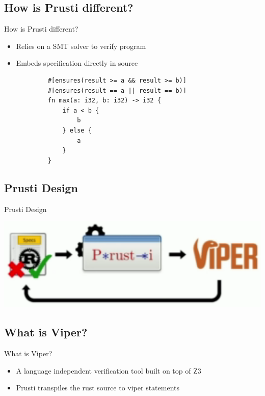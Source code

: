 \documentclass[usenames,dvipsnames,aspectratio=169]{beamer}
\begin{document}
\subsection{How is Prusti different?}
\begin{frame}[fragile]{How is Prusti different?}
    \begin{itemize}
        \item Relies on a SMT solver to verify program
        \item Embeds specification directly in source
    \end{itemize}
    \begin{block}{}
        \begin{verbatim}
            #[ensures(result >= a && result >= b)]
            #[ensures(result == a || result == b)]
            fn max(a: i32, b: i32) -> i32 {
                if a < b {
                    b
                } else {
                    a
                }
            }
        \end{verbatim}
    \end{block}
\end{frame}

\subsection{Prusti Design}
\begin{frame}{Prusti Design}
    \begin{block}{}
        \centering\includegraphics[width=\textwidth]{prusti_workflow.png}
    \end{block}
\end{frame}

\subsection{What is Viper?}
\begin{frame}[fragile]{What is Viper?}
    \begin{itemize}
        \item A language independent verification tool built on top of Z3
        \item Prusti transpiles the rust source to viper statements
    \end{itemize}
\end{frame}
\end{document}
